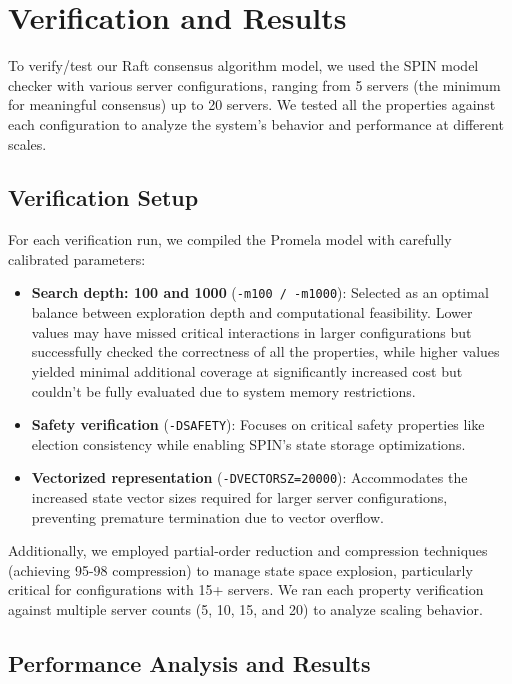 \chapter{Verification and Results}
\label{sec:verification_results}

To verify/test our Raft consensus algorithm model, we used the SPIN model checker with various server configurations, ranging from 5 servers (the minimum for meaningful consensus) up to 20 servers. We tested all the properties against each configuration to analyze the system's behavior and performance at different scales.

\section{Verification Setup}
\label{sec:verification_setup}

For each verification run, we compiled the Promela model with carefully calibrated parameters:
\begin{itemize}
    \item \textbf{Search depth: 100 and 1000} (\texttt{-m100 / -m1000}): Selected as an optimal balance between exploration depth and computational feasibility. 
    Lower values may have missed critical interactions in larger configurations but successfully checked the correctness of all the properties, while higher values yielded minimal additional coverage at significantly increased cost but couldn't be fully evaluated due to system memory restrictions.
    
    \item \textbf{Safety verification} (\texttt{-DSAFETY}): Focuses on critical safety properties like election consistency while enabling SPIN's state storage optimizations.
    
    \item \textbf{Vectorized representation} (\texttt{-DVECTORSZ=20000}): Accommodates the increased state vector sizes required for larger server configurations, preventing premature termination due to vector overflow.
\end{itemize}

Additionally, we employed partial-order reduction and compression techniques (achieving 95-98 compression) to manage state space explosion, particularly critical for configurations with 15+ servers. We ran each property verification against multiple server counts (5, 10, 15, and 20) to analyze scaling behavior.

\section{Performance Analysis and Results}
\label{sec:performance_analysis}

